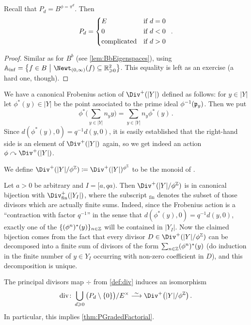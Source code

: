 \begin{lem}\label{lem:PEigenspaces}
	Recall that $P_d=B^{\phi=\pi^d}$. Then
	\begin{equation*}
		P_d=\begin{cases*}
			E & if $d=0$\\
			0 & if $d<0$\\
			\text{complicated} & if $d>0$
		\end{cases*}\,.
	\end{equation*}
\end{lem}
\begin{proof}
	Similar as for $B^b$ (see \cref{lem:BbEigenspaces}), using $\IA_\inf=\left\{f\in B\st\Newt_{(0,\infty)}(f)\subseteq \IR_{\geq 0}^2\right\}$. This equality is left as an exercise (a hard one, though).
\end{proof}
We have a canonical Frobenius action of $\Div^+(|Y|)$ defined as follows: for $y\in|Y|$ let $\phi^*(y)\in |Y|$ be the point associated to the prime ideal $\phi^{-1}(\pp_y)$. Then we put
\begin{equation*}
	\phi^*\Bigg(\sum_{y\in|Y|}n_yy\Bigg)=\sum_{y\in|Y|}n_y\phi^*(y)\,.
\end{equation*}
Since $d(\phi^*(y),0)=q^{-1}d(y,0)$, it is easily established that the right-hand side is an element of $\Div^+(|Y|)$ again, so we get indeed an action $\phi\curvearrowright \Div^+(|Y|)$.
\begin{defi}
	We define $\Div^+(|Y|/\phi^\IZ)\coloneqq \Div^+(|Y|)^{\phi^\IZ}$ to be the monoid of . 
\end{defi}
\begin{rem}\label{rem:Div+}
	Let $a>0$ be arbitrary and $I=[a,qa)$. Then $\Div^+(|Y|/\phi^\IZ)$ is in canonical bijection with $\Div^+_\mathrm{fin}(|Y_I|)$, where the subscript $_\mathrm{fin}$ denotes the subset of those divisors which are actually finite sums. Indeed, since the Frobenius action is a \enquote{contraction with factor $q^{-1}$} in the sense that $d(\phi^*(y),0)=q^{-1}d(y,0)$, exactly one of the $\{(\phi^n)^*(y)\}_{n\in\IZ}$ will be contained in $|Y_I|$. Now the claimed bijection comes from the fact that every divisor $D\in \Div^+(|Y|/\phi^\IZ)$ can be decomposed into a finite sum of divisors of the form $\sum_{n\in\IZ}(\phi^n)^*(y)$ (do induction in the finite number of $y\in Y_I$ occurring with non-zero coefficient in $D$), and this decomposition is unique.
\end{rem}
\begin{thm}\label{thm:divIso}
	The principal divisors map $\div$ from \cref{def:div} induces an isomorphism
	\begin{equation*}
		\div\colon\bigcup_{d\geq 0}\big(P_d\setminus\{0\}\big)/E^\times\isomorphism \Div^+\big(|Y|/\phi^\IZ\big)\,.
	\end{equation*}
	In particular, this implies \cref{thm:PGradedFactorial}.
\end{thm}
